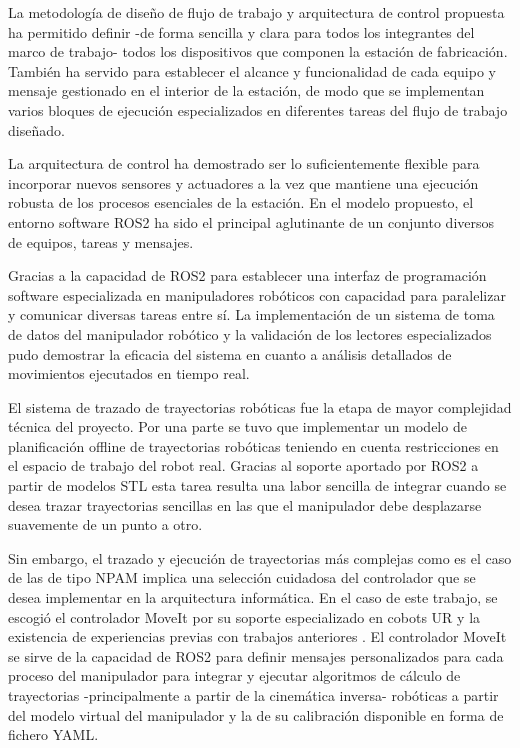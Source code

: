 La metodología de diseño de flujo de trabajo y arquitectura de control propuesta ha permitido definir -de forma sencilla y clara para todos los integrantes del marco de trabajo- todos los dispositivos que componen la estación de fabricación. También ha servido para establecer el alcance y funcionalidad de cada equipo y mensaje gestionado en el interior de la estación, de modo que se implementan varios bloques de ejecución especializados en diferentes tareas del flujo de trabajo diseñado.

La arquitectura de control ha demostrado ser lo suficientemente flexible para incorporar nuevos sensores y actuadores a la vez que mantiene una ejecución robusta de los procesos esenciales de la estación. En el modelo propuesto, el entorno software ROS2 ha sido el principal aglutinante de un conjunto diversos de equipos, tareas y mensajes. 

Gracias a la capacidad de ROS2 para establecer una interfaz de programación software especializada en manipuladores robóticos con capacidad para paralelizar y comunicar diversas tareas entre sí. La implementación de un sistema de toma de datos del manipulador robótico y la validación de los lectores especializados pudo demostrar la eficacia del sistema en cuanto a análisis detallados de movimientos ejecutados en tiempo real.

El sistema de trazado de trayectorias robóticas fue la etapa de mayor complejidad técnica del proyecto. Por una parte se tuvo que implementar un modelo de planificación offline de trayectorias robóticas teniendo en cuenta restricciones en el espacio de trabajo del robot real. Gracias al soporte aportado por ROS2 a partir de modelos \acrshort{STL} esta tarea resulta una labor sencilla de integrar cuando se desea trazar trayectorias sencillas en las que el manipulador debe desplazarse suavemente de un punto a otro. 

Sin embargo, el trazado y ejecución de trayectorias más complejas como es el caso de las de tipo \acrshort{NPAM} implica una selección cuidadosa del controlador que se desea implementar en la arquitectura informática. En el caso de este trabajo, se escogió el controlador MoveIt por su soporte especializado en cobots UR y la existencia de experiencias previas con trabajos anteriores \cite{TFM_Lu}. El controlador MoveIt se sirve de la capacidad de ROS2 para definir mensajes personalizados para cada proceso del manipulador para integrar y ejecutar algoritmos de cálculo de trayectorias -principalmente a partir de la cinemática inversa- robóticas a partir del modelo virtual del manipulador y la de su calibración disponible en forma de fichero \acrshort{YAML}. 

